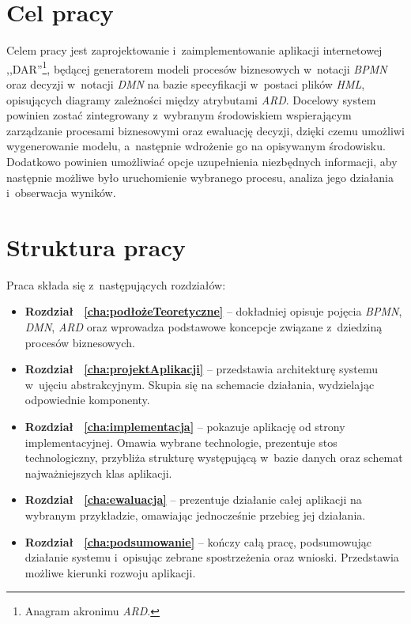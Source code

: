 \section{Cel pracy}
\label{sec:celPracy}
Celem pracy jest zaprojektowanie i~zaimplementowanie aplikacji internetowej ,,DAR''\footnote{Anagram akronimu \emph{ARD}.}, będącej generatorem modeli procesów biznesowych w~notacji \emph{BPMN} oraz decyzji w~notacji \emph{DMN} na bazie specyfikacji w~postaci plików \emph{HML}, opisujących diagramy zależności między atrybutami \emph{ARD}. Docelowy system powinien zostać zintegrowany z~wybranym środowiskiem wspierającym zarządzanie procesami biznesowymi oraz ewaluację decyzji, dzięki czemu umożliwi wygenerowanie modelu, a~następnie wdrożenie go na opisywanym środowisku. Dodatkowo powinien umożliwiać opcje uzupełnienia niezbędnych informacji, aby następnie możliwe było uruchomienie wybranego procesu, analiza jego działania i~obserwacja wyników.

\section{Struktura pracy}
\label{sec:strukturaPracy}
Praca składa się z~następujących rozdziałów:
\begin{itemize}
	\item \textbf{Rozdział ~\ref{cha:podłożeTeoretyczne}} -- dokładniej opisuje pojęcia \emph{BPMN}, \emph{DMN}, \emph{ARD} oraz wprowadza podstawowe koncepcje związane z~dziedziną procesów biznesowych.
	\item \textbf{Rozdział ~\ref{cha:projektAplikacji}} -- przedstawia architekturę systemu w~ujęciu abstrakcyjnym. Skupia się na schemacie działania, wydzielając odpowiednie komponenty. 
    \item \textbf{Rozdział ~\ref{cha:implementacja}} -- pokazuje aplikację od strony implementacyjnej. Omawia wybrane technologie, prezentuje stos technologiczny, przybliża strukturę występującą w~bazie danych oraz schemat najważniejszych klas aplikacji. 
        
    \item \textbf{Rozdział ~\ref{cha:ewaluacja}} -- prezentuje działanie całej aplikacji na wybranym przykładzie, omawiając jednocześnie przebieg jej działania.
    
    \item \textbf{Rozdział ~\ref{cha:podsumowanie}} -- kończy całą pracę, podsumowując działanie systemu i~opisując zebrane spostrzeżenia oraz wnioski. Przedstawia możliwe kierunki rozwoju aplikacji.  
\end{itemize}



















